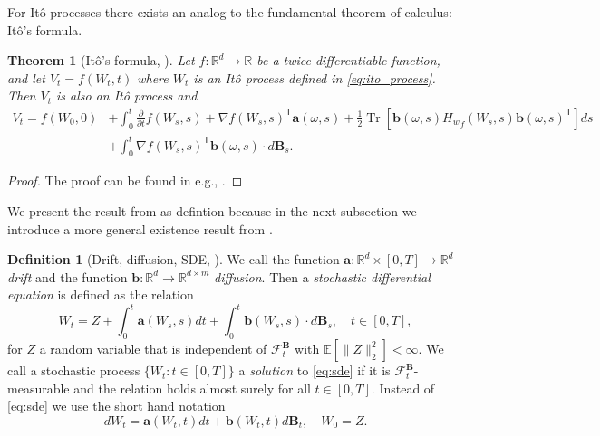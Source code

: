 \documentclass[12pt]{article}
\newtheorem{theorem}{Theorem}[section]
\theoremstyle{definition}
\newtheorem{definition}[definition]{Definition}
\numberwithin{equation}{section}
\newcommand{\R}{\mathbb{R}}
\newcommand{\CF}{\mathcal{F}}
\newcommand{\T}{\mathsf{T}}
\newcommand{\ev}[1]{\mathbb{E}\left[{#1}\right]}
\newcommand{\norm}[1]{\lVert{#1}\rVert_2}
\DeclareMathOperator{\Tr}{Tr}
\begin{document}
For Itô processes there exists an analog to the fundamental theorem of calculus: Itô's formula.
\begin{theorem}[Itô's formula, ]
  \label{thm:ito_formula}
  Let $f : \R^d \rightarrow \R$ be a twice differentiable function, and let $V_t = f(W_t, t)$ where $W_t$ is an Itô process defined in \eqref{eq:ito_process}. Then $V_t$ is also an Itô process and
  \begin{equation}
    \begin{split}
    V_t = f(W_0, 0) &+ \int_0^t \frac{\partial}{\partial t} f(W_s, s) + \nabla f(W_s, s)^\T \mathbf{a}(\omega,s)+ \frac{1}{2}\Tr\left[\mathbf{b}(\omega,s) {H_w}_f(W_s, s) \mathbf{b}(\omega,s)^\T\right]ds \\
    &+ \int_0^t \nabla f(W_s, s)^\T \mathbf{b}(\omega,s) \cdot d\mathbf{B}_s.
    \end{split}
  \end{equation}
\end{theorem}
\begin{proof}
  The proof can be found in e.g., \cite{baldiEquazioniDifferenzialiStocastiche2000}.
\end{proof}
We present the result from \cite[pp.~149]{eAppliedStochasticAnalysis2021} as defintion because in the next subsection we introduce a more general existence result from \cite{liStochasticModifiedEquations2019}.
\begin{definition}[Drift, diffusion, SDE, ]
  We call the function $\mathbf{a} : \R^d \times [0,T] \rightarrow \R^d$ \emph{drift} and the function $\mathbf{b} : \R^d \rightarrow \R^{d \times m}$ \emph{diffusion}. Then a \emph{stochastic differential equation} is defined as the relation
  \begin{equation}
    \label{eq:sde}
    W_t = Z + \int_0^t \mathbf{a}(W_s, s) dt + \int_0^t \mathbf{b}(W_s,s)\cdot d\mathbf{B}_s, \quad t \in [0,T],
  \end{equation}
  for $Z$ a random variable that is independent of $\CF_t^\mathbf{B}$ with $\ev{\norm{Z}^2} < \infty$.
  We call a stochastic process $\{W_t:t\in [0,T] \}$ a \emph{solution} to \eqref{eq:sde} if it is $\CF_t^\mathbf{B}$-measurable and the relation holds almost surely for all $t \in [0,T]$. Instead of \eqref{eq:sde} we use the short hand notation
  \begin{equation*}
    dW_t = \mathbf{a}(W_t,t)dt + \mathbf{b}(W_t,t)d\mathbf{B}_t, \quad W_0 = Z.
  \end{equation*}
\end{definition}
\end{document}
